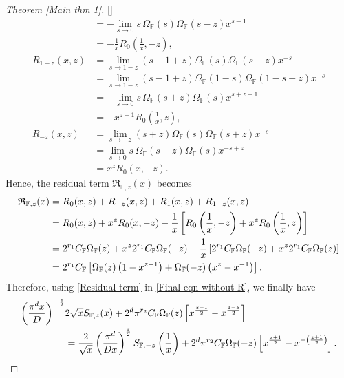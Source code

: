 \documentclass[12pt,reqno]{amsart}
\renewcommand{\(}{\left\(}
\renewcommand{\)}{\right\)}
\renewcommand{\[}{\left\[}
\renewcommand{\]}{\right\]}
\numberwithin{equation}{section}
\theoremstyle{plain}
\begin{document}
\begin{proof}[Theorem \rm{\ref{Main thm 1}}][]
{\begin{align*}
&= -\lim_{s \rightarrow 0} s\,\Omega_{\mathbb{F}}(s)\Omega_{\mathbb{F}}(s-z)x^{s-1} \\
&= -\frac{1}{x}R_{0}\left(\frac{1}{x},-z\right), \\
R_{1-z}(x,z) &= \lim_{s \rightarrow 1-z}(s-1+z)\Omega_{\mathbb{F}}(s)\Omega_{\mathbb{F}}(s+z)x^{-s} \\
&= \lim_{s \rightarrow 1-z}(s-1+z)\Omega_{\mathbb{F}}(1-s)\Omega_{\mathbb{F}}(1-s-z)x^{-s}\\
&= -\lim_{s \rightarrow 0}s\,\Omega_{\mathbb{F}}(s+z)\Omega_{\mathbb{F}}(s)x^{s+z-1}\\
&= -x^{z-1}R_{0}\left(\frac{1}{x}, z\right), \\
R_{-z}(x,z) &= \lim_{s \rightarrow -z} (s+z)\Omega_{\mathbb{F}}(s)\Omega_{\mathbb{F}}(s+z)x^{-s} \\
&= \lim_{s \rightarrow 0} s\,\Omega_{\mathbb{F}}(s-z)\Omega_{\mathbb{F}}(s)x^{-s+z} \\
&= x^zR_{0}(x, -z).
\end{align*}}
Hence, the residual term $\mathfrak{R}_{\mathbb{F}, z}(x)$ becomes
\begin{align}
\mathfrak{R}_{\mathbb{F}, z}(x) &= R_{0}(x,z) + R_{-z}(x,z) + R_{1}(x,z) + R_{1-z}(x,z) \notag\\
&= R_{0}(x,z) + x^zR_{0}(x, -z) - \frac{1}{x}\left[R_{0}\left(\frac{1}{x},-z\right) + x^zR_{0}\left(\frac{1}{x}, z\right) \right] \notag\\
&= 2^{r_1}C_{\mathbb{F}}\Omega_{\mathbb{F}}(z) + x^z 2^{r_1}C_{\mathbb{F}}\Omega_{\mathbb{F}}(-z) - \frac{1}{x}\left[2^{r_1}C_{\mathbb{F}}\Omega_{\mathbb{F}}(-z) + x^z 2^{r_1}C_{\mathbb{F}}\Omega_{\mathbb{F}}(z) \right] \notag \\
&= 2^{r_1}C_{\mathbb{F}}\left[\Omega_{\mathbb{F}}(z)\left(1 - x^{z-1} \right) + \Omega_{\mathbb{F}}(-z)\left(x^{z} - x^{-1} \right)\right]. \label{Residual term}
\end{align}
Therefore, using \eqref{Residual term} in \eqref{Final eqn without R}, we finally have
\begin{align}
\left(\frac{\pi^d x}{D}\right)^{-\frac{z}{2}}&2\sqrt{x}S_{\mathbb{F}, z}(x) + 2^d\pi^{r_2}C_{\mathbb{F}}\Omega_{\mathbb{F}}(z)\left[x^{\frac{z-1}{2}} - x^{\frac{1-z}{2}} \right]  \notag \\
&= \frac{2}{\sqrt{x}}\left(\frac{\pi^d}{Dx}\right)^{\frac{z}{2}}S_{\mathbb{F}, -z}\left(\frac{1}{x}\right) + 2^d\pi^{r_2}C_{\mathbb{F}}\Omega_{\mathbb{F}}(-z)\left[x^{\frac{z+1}{2}} - x^{-\left(\frac{z+1}{2}\right)} \right]. \label{For S(1/x)}

\end{align}
\end{proof}
\end{document}
